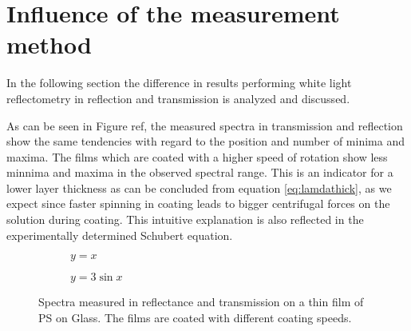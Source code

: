 \section{Influence of the measurement method}
\label{sec:Method}

In the following section the difference in results performing white light reflectometry in reflection
and transmission is analyzed and discussed.

As can be seen in Figure ref, the measured spectra in transmission and reflection show the same tendencies with regard to the position and number of minima and maxima. The films which are coated with a higher speed of rotation show less minnima and maxima in the 
observed spectral range. This is an indicator for a lower layer thickness as can be concluded from equation \ref{eq:lamdathick}, as we expect since faster spinning in coating leads to 
bigger centrifugal forces on the solution during coating. This intuitive explanation is also reflected in the experimentally determined Schubert equation. 


\begin{figure}[ht]
    \centering
    \begin{subfigure}[b]{0.70\textwidth}
        \centering
        
        \caption{$y=x$}
        \label{fig:y equals x}
    \end{subfigure}  
    

    \begin{subfigure}[b]{0.70\textwidth}
        \centering
           
        \caption{$y=3\sin x$} 
        \label{fig:three sin x}
    \end{subfigure}

    \caption{Spectra measured in reflectance and transmission on a thin film of PS on Glass. The films are coated with different coating speeds.}
    \label{fig:three graphs}
\end{figure}